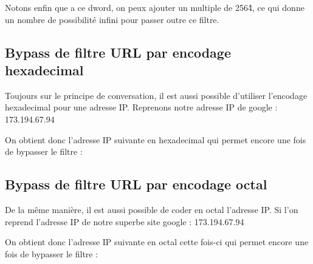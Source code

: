 \documentclass{article}
\begin{document}
Notons enfin que a ce dword, on peux ajouter un multiple de 256\^4, ce qui donne un nombre de possibilité infini pour passer outre ce filtre.

\subsection{Bypass de filtre URL par encodage hexadecimal}

Toujours sur le principe de conversation, il est aussi possible d'utiliser l'encodage hexadecimal pour une adresse IP. Reprenons notre adresse IP de google : 173.194.67.94
\vspace{0.2cm}\\
\vspace{0.2cm}

On obtient donc l'adresse IP suivante en hexadecimal qui permet encore une fois de bypasser le filtre :
\vspace{0.2cm}\\
\vspace{0.2cm}

\subsection{Bypass de filtre URL par encodage octal}

De la même manière, il est aussi possible de coder en octal l'adresse IP. Si l'on reprend l'adresse IP de notre superbe site google : 173.194.67.94
\vspace{0.2cm}\\
\vspace{0.2cm}

On obtient donc l'adresse IP suivante en octal cette fois-ci qui permet encore une fois de bypasser le filtre :
\vspace{0.2cm}\\
\vspace{0.2cm}
\end{document}
